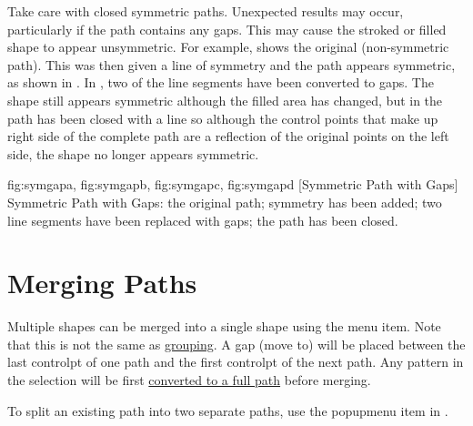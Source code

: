 \begin{warning}
Take care with closed symmetric paths. Unexpected results
may occur, particularly if the path contains any gaps. This may
cause the stroked or filled shape to appear unsymmetric.
For example,  shows the original
(non-symmetric path). This was then given a line of symmetry and
the path appears symmetric, as shown in . In
, two of the line segments have been
converted to gaps. The shape still appears symmetric although the
filled area has changed, but in  the path
has been closed with a line so although the control points that
make up right side of the complete path are a reflection of the
original points on the left side, the shape no longer appears
symmetric.
\end{warning}

{
  {fig:symgapa}{}{},
  {fig:symgapb}{}{},
  {fig:symgapc}{}{},
  {fig:symgapd}{}{}
}
[Symmetric Path with Gaps]
{Symmetric Path with Gaps:
 the original path;
 symmetry has been added;
 two line segments have been replaced with gaps;
 the path has been closed.}


\section{Merging Paths}\label{sec:mergepaths}


Multiple \glspl{shape} can be merged into a single \gls*{shape}
using the  menu item. Note that this is not
the same as \hyperref[sec:grouping]{grouping}.  A \gls{gap} (move
to) will be placed between the last \gls{controlpt} of one path and
the first \gls*{controlpt} of the next path. Any \gls{pattern} in
the selection will be first \hyperref[sec:converttofullpath]{converted
to a full path} before merging.

\begin{information}
To split an existing \gls{path} into two separate \glspl{path}, use the
 \gls*{popupmenu} item in \editpathmode.
\end{information}

